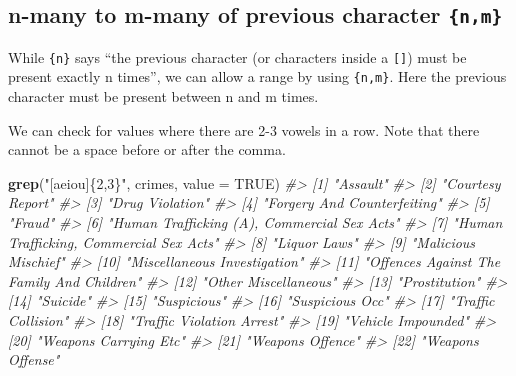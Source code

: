 \documentclass[
  12pt,
]{book}
\newenvironment{Shaded}{\begin{snugshade}}{\end{snugshade}}
\newcommand{\CommentTok}[1]{\textcolor[rgb]{0.37,0.37,0.37}{\textit{#1}}}
\newcommand{\DataTypeTok}[1]{\textcolor[rgb]{0.27,0.27,0.27}{#1}}
\newcommand{\KeywordTok}[1]{\textcolor[rgb]{0.27,0.27,0.27}{\textbf{#1}}}
\newcommand{\NormalTok}[1]{#1}
\newcommand{\OtherTok}[1]{\textcolor[rgb]{0.37,0.37,0.37}{#1}}
\newcommand{\StringTok}[1]{\textcolor[rgb]{0.5,0.5,0.5}{#1}}
\begin{document}
\hypertarget{n-many-to-m-many-of-previous-character-nm}{%
\subsection{\texorpdfstring{n-many to m-many of previous character \texttt{\{n,m\}}}{n-many to m-many of previous character \{n,m\}}}\label{n-many-to-m-many-of-previous-character-nm}}

While \texttt{\{n\}} says ``the previous character (or characters inside a \texttt{{[}{]}}) must be present exactly n times'', we can allow a range by using \texttt{\{n,m\}}. Here the previous character must be present between n and m times.

We can check for values where there are 2-3 vowels in a row. Note that there cannot be a space before or after the comma.

\begin{Shaded}
\begin{Highlighting}[]
\KeywordTok{grep}\NormalTok{(}\StringTok{"[aeiou]\{2,3\}"}\NormalTok{, crimes, }\DataTypeTok{value =} \OtherTok{TRUE}\NormalTok{)}
\CommentTok{\#\textgreater{}  [1] "Assault"                                   }
\CommentTok{\#\textgreater{}  [2] "Courtesy Report"                           }
\CommentTok{\#\textgreater{}  [3] "Drug Violation"                            }
\CommentTok{\#\textgreater{}  [4] "Forgery And Counterfeiting"                }
\CommentTok{\#\textgreater{}  [5] "Fraud"                                     }
\CommentTok{\#\textgreater{}  [6] "Human Trafficking (A), Commercial Sex Acts"}
\CommentTok{\#\textgreater{}  [7] "Human Trafficking, Commercial Sex Acts"    }
\CommentTok{\#\textgreater{}  [8] "Liquor Laws"                               }
\CommentTok{\#\textgreater{}  [9] "Malicious Mischief"                        }
\CommentTok{\#\textgreater{} [10] "Miscellaneous Investigation"               }
\CommentTok{\#\textgreater{} [11] "Offences Against The Family And Children"  }
\CommentTok{\#\textgreater{} [12] "Other Miscellaneous"                       }
\CommentTok{\#\textgreater{} [13] "Prostitution"                              }
\CommentTok{\#\textgreater{} [14] "Suicide"                                   }
\CommentTok{\#\textgreater{} [15] "Suspicious"                                }
\CommentTok{\#\textgreater{} [16] "Suspicious Occ"                            }
\CommentTok{\#\textgreater{} [17] "Traffic Collision"                         }
\CommentTok{\#\textgreater{} [18] "Traffic Violation Arrest"                  }
\CommentTok{\#\textgreater{} [19] "Vehicle Impounded"                         }
\CommentTok{\#\textgreater{} [20] "Weapons Carrying Etc"                      }
\CommentTok{\#\textgreater{} [21] "Weapons Offence"                           }
\CommentTok{\#\textgreater{} [22] "Weapons Offense"}
\end{Highlighting}
\end{Shaded}
\end{document}
